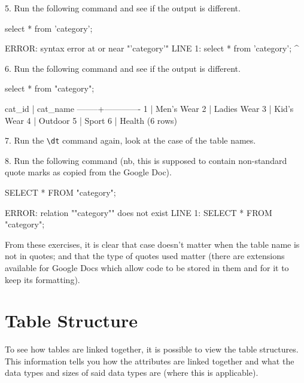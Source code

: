 5. Run the following command and see if the output is different.
\begin{sql}
select * from 'category';
\end{sql}
\begin{pseudo*}
ERROR:  syntax error at or near "'category'"
LINE 1: select * from 'category';
                      ^
\end{pseudo*}

6. Run the following command and see if the output is different.
\begin{sql}
select * from "category";
\end{sql}
\begin{pseudo*}
cat_id |  cat_name   
--------+-------------
    1 | Men's Wear
    2 | Ladies Wear
    3 | Kid's Wear
    4 | Outdoor
    5 | Sport
    6 | Health
(6 rows)
\end{pseudo*}

7. Run the \verb|\dt| command again, look at the case of the table names.

8. Run the following command (nb, this is supposed to contain non-standard quote marks as copied from the Google Doc).
\begin{sql}
SELECT * FROM "category";
\end{sql}
\begin{pseudo*}
ERROR:  relation ""category"" does not exist
LINE 1: SELECT * FROM "category";
\end{pseudo*}

From these exercises, it is clear that case doesn't matter when the table name is not in quotes; and that the type of quotes used matter (there are extensions available for Google Docs which allow code to be stored in them and for it to keep its formatting).

\section*{Table Structure}
To see how tables are linked together, it is possible to view the table structures. This information tells you how the attributes are linked together and what the data types and sizes of said data types are (where this is applicable). 

